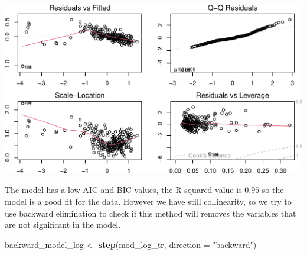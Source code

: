 \documentclass[
]{article}
\newenvironment{Shaded}{\begin{snugshade}}{\end{snugshade}}
\newcommand{\AttributeTok}[1]{\textcolor[rgb]{0.13,0.29,0.53}{#1}}
\newcommand{\FunctionTok}[1]{\textcolor[rgb]{0.13,0.29,0.53}{\textbf{#1}}}
\newcommand{\NormalTok}[1]{#1}
\newcommand{\OtherTok}[1]{\textcolor[rgb]{0.56,0.35,0.01}{#1}}
\newcommand{\StringTok}[1]{\textcolor[rgb]{0.31,0.60,0.02}{#1}}
\begin{document}
\begin{center}\includegraphics{Statistical_Learning_Final_Report_files/figure-latex/standardization-1} \end{center}

The model has a low AIC and BIC values, the R-squared value is \(0.95\)
so the model is a good fit for the data. However we have still
collinearity, so we try to use backward elimination to check if this
method will removes the variables that are not significant in the model.

\begin{Shaded}
\begin{Highlighting}[]
\NormalTok{backward\_model\_log }\OtherTok{\textless{}{-}} \FunctionTok{step}\NormalTok{(mod\_log\_tr, }\AttributeTok{direction =} \StringTok{"backward"}\NormalTok{)}
\end{Highlighting}
\end{Shaded}
\end{document}
